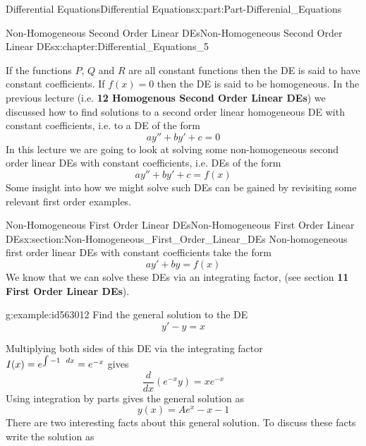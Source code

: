 \documentclass[oneside,10pt,]{book}
\newcommand{\terminology}[1]{\textbf{#1}}
\numberwithin{equation}{section}
\begin{document}
\begin{partptx}{Differential Equations}{}{Differential Equations}{}{}{x:part:Part-Differenial_Equations}
\begin{chapterptx}{Non-Homogeneous Second Order Linear DEs}{}{Non-Homogeneous Second Order Linear DEs}{}{}{x:chapter:Differential_Equations_5}
\begin{introduction}{}
If the functions \(P\), \(Q\) and \(R\) are all constant functions then the DE is said to have constant coefficients. If \(f(x)=0\) then the DE is said to be homogeneous. In the previous lecture (i.e. \terminology{12 Homogenous Second Order Linear DEs}) we discussed how to find solutions to a second order linear homogeneous DE with constant coefficients, i.e. to a DE of the form%
\begin{equation*}
ay''+by'+c=0
\end{equation*}
In this lecture we are going to look at solving some non-homogeneous second order linear DEs with constant coefficients, i.e. DEs of the form%
\begin{equation*}
ay''+by'+c=f(x)
\end{equation*}
Some insight into how we might solve such DEs can be gained by revisiting some relevant first order examples.%
\end{introduction}%
%
%
\typeout{************************************************}
\typeout{************************************************}
%
\begin{sectionptx}{Non-Homogeneous First Order Linear DEs}{}{Non-Homogeneous First Order Linear DEs}{}{}{x:section:Non-Homogeneous_First_Order_Linear_DEs}
Non-homogeneous first order linear DEs with constant coefficients take the form%
\begin{equation*}
ay'+by=f(x)
\end{equation*}
We know that we can solve these DEs via an integrating factor, (see section \terminology{11 First Order Linear DEs}).%
\begin{example}{}{g:example:id563012}%
Find the general solution to the DE%
\begin{equation*}
y'-y=x
\end{equation*}
%
\par\smallskip%
\noindent\hypertarget{g:solution:id563060}{}Multiplying both sides of this DE via the integrating factor \(I(x)=e^{\int -1\hspace{2mm}dx}=e^{-x}\) gives%
\begin{equation*}
\frac{d}{dx}(e^{-x}y)=xe^{-x}
\end{equation*}
Using integration by parts gives the general solution as%
\begin{equation*}
y(x)=Ae^x-x-1
\end{equation*}
There are two interesting facts about this general solution. To discuss these facts write the solution as%
\begin{equation*}

\end{equation*}
\end{example}
\end{sectionptx}
\end{chapterptx}
\end{partptx}
\end{document}
